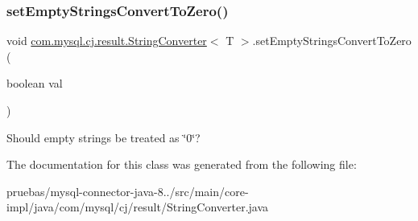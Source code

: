 \subsubsection{\texorpdfstring{set\+Empty\+Strings\+Convert\+To\+Zero()}{setEmptyStringsConvertToZero()}}
{\footnotesize\ttfamily void \mbox{\hyperlink{classcom_1_1mysql_1_1cj_1_1result_1_1_string_converter}{com.\+mysql.\+cj.\+result.\+String\+Converter}}$<$ T $>$.set\+Empty\+Strings\+Convert\+To\+Zero (\begin{DoxyParamCaption}\item[{boolean}]{val }\end{DoxyParamCaption})}

Should empty strings be treated as \char`\"{}0\char`\"{}? 

The documentation for this class was generated from the following file\+:\begin{DoxyCompactItemize}
\item 
pruebas/mysql-\/connector-\/java-\/8../src/main/core-\/impl/java/com/mysql/cj/result/String\+Converter.\+java\end{DoxyCompactItemize}
